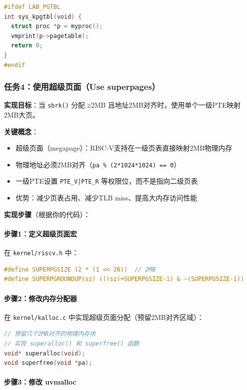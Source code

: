 \begin{lstlisting}[language=C]
#ifdef LAB_PGTBL
int sys_kpgtbl(void) {
  struct proc *p = myproc();
  vmprint(p->pagetable);
  return 0;
}
#endif
\end{lstlisting}

\subsubsection{任务4：使用超级页面（Use superpages）}

\textbf{实现目标}：当 \texttt{sbrk()} 分配 ≥2MB 且地址2MB对齐时，使用单个一级PTE映射2MB大页。

\textbf{关键概念}：
\begin{itemize}
    \item 超级页面（megapage）：RISC-V支持在一级页表直接映射2MB物理内存
    \item 物理地址必须2MB对齐（\texttt{pa \% (2*1024*1024) == 0}）
    \item 一级PTE设置 \texttt{PTE\_V|PTE\_R} 等权限位，而不是指向二级页表
    \item 优势：减少页表占用、减少TLB miss、提高大内存访问性能
\end{itemize}

\textbf{实现步骤}（根据你的代码）：

\paragraph{步骤1：定义超级页面宏}

在 \texttt{kernel/riscv.h} 中：

\begin{lstlisting}[language=C]
#define SUPERPGSIZE (2 * (1 << 20))  // 2MB
#define SUPERPGROUNDUP(sz) (((sz)+SUPERPGSIZE-1) & ~(SUPERPGSIZE-1))
\end{lstlisting}

\paragraph{步骤2：修改内存分配器}

在 \texttt{kernel/kalloc.c} 中实现超级页面分配（预留2MB对齐区域）：

\begin{lstlisting}[language=C]
// 预留几个2MB对齐的物理内存块
// 实现 superalloc() 和 superfree() 函数
void* superalloc(void);
void superfree(void *pa);
\end{lstlisting}

\paragraph{步骤3：修改 uvmalloc}

